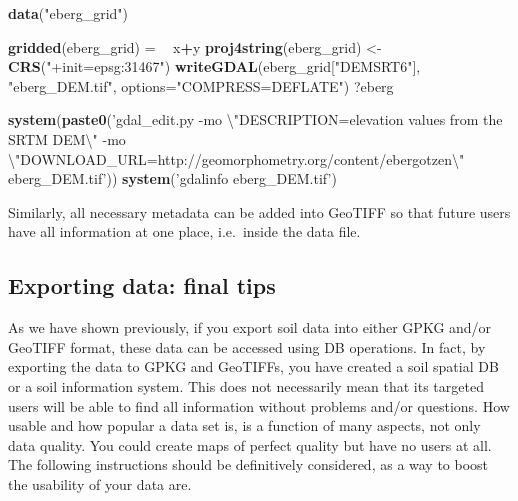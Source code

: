 \documentclass[10pt,b5paper,]{book}
\newenvironment{Shaded}{\begin{snugshade}}{\end{snugshade}}
\newcommand{\CharTok}[1]{\textcolor[rgb]{0.31,0.60,0.02}{#1}}
\newcommand{\DataTypeTok}[1]{\textcolor[rgb]{0.13,0.29,0.53}{#1}}
\newcommand{\ErrorTok}[1]{\textcolor[rgb]{0.64,0.00,0.00}{\textbf{#1}}}
\newcommand{\KeywordTok}[1]{\textcolor[rgb]{0.13,0.29,0.53}{\textbf{#1}}}
\newcommand{\NormalTok}[1]{#1}
\newcommand{\OperatorTok}[1]{\textcolor[rgb]{0.81,0.36,0.00}{\textbf{#1}}}
\newcommand{\StringTok}[1]{\textcolor[rgb]{0.31,0.60,0.02}{#1}}
\theoremstyle{definition}
\theoremstyle{definition}
\theoremstyle{definition}
\theoremstyle{remark}
\begin{document}
\begin{Shaded}
\begin{Highlighting}[]
\KeywordTok{data}\NormalTok{(}\StringTok{"eberg_grid"}\NormalTok{)}

\KeywordTok{gridded}\NormalTok{(eberg_grid) =}\StringTok{ }\ErrorTok{~}\StringTok{ }\NormalTok{x}\OperatorTok{+}\NormalTok{y}
\KeywordTok{proj4string}\NormalTok{(eberg_grid) <-}\StringTok{ }\KeywordTok{CRS}\NormalTok{(}\StringTok{"+init=epsg:31467"}\NormalTok{)}
\KeywordTok{writeGDAL}\NormalTok{(eberg_grid[}\StringTok{"DEMSRT6"}\NormalTok{], }\StringTok{"eberg_DEM.tif"}\NormalTok{, }
            \DataTypeTok{options=}\StringTok{"COMPRESS=DEFLATE"}\NormalTok{)}
\NormalTok{?eberg}

\KeywordTok{system}\NormalTok{(}\KeywordTok{paste0}\NormalTok{(}\StringTok{'gdal_edit.py }
\StringTok{-mo }\CharTok{\textbackslash{}"}\StringTok{DESCRIPTION=elevation values from the SRTM DEM}\CharTok{\textbackslash{}"}\StringTok{ }
\StringTok{-mo }\CharTok{\textbackslash{}"}\StringTok{DOWNLOAD_URL=http://geomorphometry.org/content/ebergotzen}\CharTok{\textbackslash{}"}
\StringTok{eberg_DEM.tif'}\NormalTok{))}
\KeywordTok{system}\NormalTok{(}\StringTok{'gdalinfo eberg_DEM.tif'}\NormalTok{)}
\end{Highlighting}
\end{Shaded}

Similarly, all necessary metadata can be added into GeoTIFF so that
future users have all information at one place, i.e.~inside the data
file.

\hypertarget{exporting-data-final-tips}{%
\subsection{Exporting data: final
tips}\label{exporting-data-final-tips}}

As we have shown previously, if you export soil data into either GPKG
and/or GeoTIFF format, these data can be accessed using DB operations.
In fact, by exporting the data to GPKG and GeoTIFFs, you have created a
soil spatial DB or a soil information system. This does not necessarily
mean that its targeted users will be able to find all information
without problems and/or questions. How usable and how popular a data set
is, is a function of many aspects, not only data quality. You could
create maps of perfect quality but have no users at all. \textbar{}The
following instructions should be definitively considered, as a way to
boost the usability of your data are.
\end{document}
